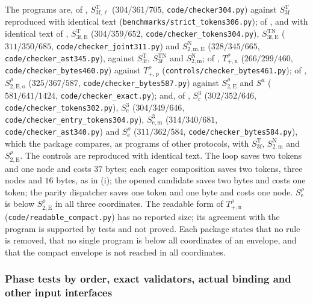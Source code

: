 The programs are, of , $S^{\mathrm T}_{3\mathrm f,\ell}$
($304/361/705$, \texttt{code/checker304.py}) against $S^{\mathrm T}_{3\mathrm f}$
reproduced with identical text (\texttt{benchmarks/strict\_tokens306.py}); of
, and with identical text of ,
$S^{\mathrm T}_{3\mathrm f,\mathrm E}$ ($304/359/652$,
\texttt{code/checker\_tokens304.py}), $S^{\mathrm{TN}}_{3\mathrm f,\mathrm E}$
($311/350/685$, \texttt{code/checker\_joint311.py}) and
$S^{\mathrm N}_{2,\mathrm{m,E}}$ ($328/345/665$, \texttt{code/checker\_ast345.py}),
against $S^{\mathrm T}_{3\mathrm f}$, $S^{\mathrm{TN}}_{3\mathrm f}$ and
$S^{\mathrm N}_{2,\mathrm m}$; of , $T^{\rho}_{+,\mathrm n}$
($266/299/460$, \texttt{code/checker\_bytes460.py}) against $T^{\rho}_{+,\mathrm p}$
(\texttt{controls/checker\_bytes461.py}); of ,
$S^{\rho}_{2,\mathrm{E,o}}$ ($325/367/587$, \texttt{code/checker\_bytes587.py}) against
$S^{\rho}_{2,\mathrm E}$ and $S^{\mathrm x}$ ($581/641/1424$,
\texttt{code/checker\_exact.py}); and, of , $S^{3}_{\mathrm r}$
($302/352/646$, \texttt{code/checker\_tokens302.py}), $S^{3}_{\mathrm e}$
($304/349/646$, \texttt{code/checker\_entry\_tokens304.py}), $S^{3}_{\mathrm{e,m}}$
($314/340/681$, \texttt{code/checker\_ast340.py}) and $S^{\rho}_{\mathrm e}$
($311/362/584$, \texttt{code/checker\_bytes584.py}), which the package compares, as
programs of other protocols, with $S^{\mathrm T}_{3\mathrm f}$, $S^{\mathrm N}_{2,\mathrm m}$
and $S^{\rho}_{2,\mathrm E}$. The controls are reproduced with identical text. The loop
saves two tokens and one node and costs $37$ bytes; each eager composition saves two
tokens, three nodes and $16$ bytes, as in (i); the opened candidate saves two bytes and
costs one token; the parity dispatcher saves one token and one byte and costs one
node. $S^{\rho}_{\mathrm e}$ is below $S^{\rho}_{2,\mathrm E}$ in all three
coordinates. The readable form of $T^{\rho}_{+,\mathrm n}$
(\texttt{code/readable\_compact.py}) has no reported size; its agreement with the
program is supported by tests and not proved. Each package states that no rule is
removed, that no single program is below all coordinates of an envelope, and that the
compact envelope is not reached in all coordinates.

\subsubsection*{Phase tests by order, exact validators, actual binding and other input interfaces}

